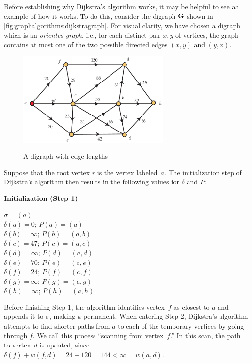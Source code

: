 Before establishing why Dijkstra's algorithm works, it may be helpful
to see an example of how it works. To do this, consider the digraph
$\mathbf{G}$ shown in \autoref{fig:graphalgorithms:dijkstragraph}.  For
visual clarity, we have chosen a digraph which is an \textit{oriented
  graph}, i.e., for each distinct pair $x,y$ of vertices, the graph
contains at most one of the two possible directed edges $(x,y)$ and
$(y,x)$.

\begin{figure}[t]
\begin{center}
\includegraphics[width=3in]{graphalgorithms-figs/dijkstragraph}\\
\caption{A digraph with edge lengths}
\label{fig:graphalgorithms:dijkstragraph}
\end{center}
\end{figure}

Suppose that the root vertex $r$ is the vertex labeled~$a$. The
initialization step of Dijkstra's algorithm then results in the
following values for $\delta$ and $P$:

\textbf{Initialization (Step 1)}

\begingroup
{}
\rightskip\leftskip

\medskip
$\sigma=(a)$\\
$\delta(a)=0$; $P(a)=(a)$\\
$\delta(b)=\infty$; $P(b)=(a,b)$\\
$\delta(c)=47$; $P(c)=(a,c)$\\
$\delta(d)=\infty$; $P(d)=(a,d)$\\
$\delta(e)=70$; $P(e)=(a,e)$\\
$\delta(f)=24$; $P(f)=(a,f)$\\
$\delta(g)=\infty$; $P(g)=(a,g)$\\
$\delta(h)=\infty$; $P(h)=(a,h)$\\

\endgroup

Before finishing Step 1, the algorithm identifies vertex~$f$ as
closest to $a$ and appends it to $\sigma$, making $a$ permanent. When
entering Step 2, Dijkstra's algorithm attempts to find shorter paths
from $a$ to each of the temporary vertices by going through $f$. We
call this process ``scanning from vertex~$f$.'' In this scan, the path
to vertex~$d$ is updated, since $\delta(f) + w(f,d)=24+120=144<
\infty=w(a,d)$.

